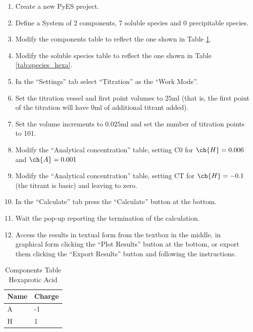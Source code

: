 \documentclass[a4paper, 12pt]{article}
\begin{document}
\begin{enumerate}
    \item Create a new PyES project.
    \item Define a System of 2 components, 7 soluble species and 0 precipitable species.
    \item Modify the components table to reflect the one shown in Table \ref*{tab:comp_hexa}.
    \item Modify the soluble species table to reflect the one shown in Table \ref*{tab:species_hexa}.
    \item In the ``Settings'' tab select ``Titration'' as the ``Work Mode''.
    \item Set the titration vessel and first point volumes to $25 \unit{\ml}$ (that is, the first point of the titration will have $0 \unit{\ml}$ of additional titrant added).
    \item Set the volume increments to $0.025 \unit{\ml}$ and set the number of titration points to 101.
    \item Modify the ``Analytical concentration'' table, setting C0 for $\ch{H} = 0.006$ and  $\ch{A} = 0.001$
    \item Modify the ``Analytical concentration'' table, setting CT for $\ch{H} = -0.1$ (the titrant is basic) and leaving  to zero.
    \item In the ``Calculate'' tab press the ``Calculate'' button at the bottom.
    \item Wait the pop-up reporting the termination of the calculation.
    \item Access the results in textual form from the textbox in the middle, in graphical form clicking the ``Plot Results'' button at the bottom, or export them clicking the ``Export Results'' button and following the instructions.
\end{enumerate}

\begin{table}[h!]
\centering
\begin{tabular}{|l|l|}
        \hline
        \textbf{Name} & \textbf{Charge} \\ \hline
        A   & -1      \\ \hline
        H    & 1      \\ \hline
\end{tabular}
\caption{Components Table Hexaprotic Acid}
\label{tab:comp_hexa}
\end{table}
\end{document}
